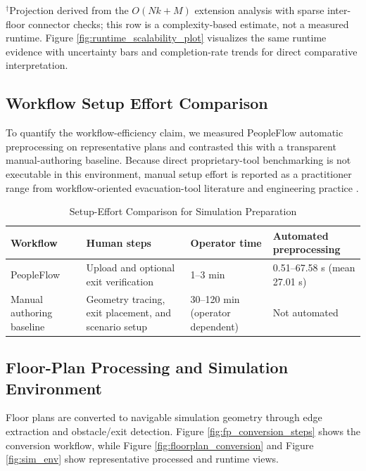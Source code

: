 \documentclass[utf8]{FrontiersinHarvard}
\begin{document}
{\footnotesize $^\dagger$Projection derived from the $O(Nk+M)$ extension analysis with sparse inter-floor connector checks; this row is a complexity-based estimate, not a measured runtime.}
Figure \ref{fig:runtime_scalability_plot} visualizes the same runtime evidence with uncertainty bars and completion-rate trends for direct comparative interpretation.

\subsection{Workflow Setup Effort Comparison}
To quantify the workflow-efficiency claim, we measured PeopleFlow automatic preprocessing on representative plans and contrasted this with a transparent manual-authoring baseline. Because direct proprietary-tool benchmarking is not executable in this environment, manual setup effort is reported as a practitioner range from workflow-oriented evacuation-tool literature and engineering practice \cite{path_planning,ronchi2015}.

\begin{table}[t]
\centering
\caption{Setup-Effort Comparison for Simulation Preparation}
\label{tab:setup_effort}
{\footnotesize
\setlength{\tabcolsep}{4pt}
\renewcommand{\arraystretch}{1.06}
\begin{tabular}{L{2.35cm} L{4.70cm} L{2.55cm} L{3.00cm}}
\toprule
\textbf{Workflow} & \textbf{Human steps} & \textbf{Operator time} & \textbf{Automated preprocessing} \\
\midrule
PeopleFlow & Upload and optional exit verification & 1--3 min & 0.51--67.58 s (mean 27.01 s) \\
Manual authoring baseline & Geometry tracing, exit placement, and scenario setup & 30--120 min (operator dependent) & Not automated \\
\bottomrule
\end{tabular}
}
\end{table}

\subsection{Floor-Plan Processing and Simulation Environment}
Floor plans are converted to navigable simulation geometry through edge extraction and obstacle/exit detection. Figure \ref{fig:fp_conversion_steps} shows the conversion workflow, while Figure \ref{fig:floorplan_conversion} and Figure \ref{fig:sim_env} show representative processed and runtime views.
\end{document}
